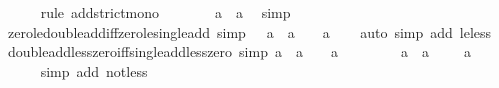 \begin{isabellebody}
\ \ \ \ \isamarkupfalse%
\ {\isacharparenleft}{\kern0pt}rule\ add{\isacharunderscore}{\kern0pt}strict{\isacharunderscore}{\kern0pt}mono{\isacharparenright}{\kern0pt}\isanewline
\ \ \isamarkupfalse%
\ \isamarkupfalse%
\ {\isachardoublequoteopen}{}\ {\isacharless}{\kern0pt}\ a\ {\isacharplus}{\kern0pt}\ a{\isachardoublequoteclose}\ \isamarkupfalse%
\ simp\isanewline
{}\isamarkupfalse%
%
\endisatagproof
{\isafoldproof}%
%
\isadelimproof
\isanewline
%
\endisadelimproof
\isanewline
{}\isamarkupfalse%
\ zero{\isacharunderscore}{\kern0pt}le{\isacharunderscore}{\kern0pt}double{\isacharunderscore}{\kern0pt}add{\isacharunderscore}{\kern0pt}iff{\isacharunderscore}{\kern0pt}zero{\isacharunderscore}{\kern0pt}le{\isacharunderscore}{\kern0pt}single{\isacharunderscore}{\kern0pt}add\ {\isacharbrackleft}{\kern0pt}simp{\isacharbrackright}{\kern0pt}{\isacharcolon}{\kern0pt}\ {\isachardoublequoteopen}{}\ {\isasymle}\ a\ {\isacharplus}{\kern0pt}\ a\ {\isasymlongleftrightarrow}\ {}\ {\isasymle}\ a{\isachardoublequoteclose}\isanewline
%
\isadelimproof
\ \ %
\endisadelimproof
%
\isatagproof
{}\isamarkupfalse%
\ {\isacharparenleft}{\kern0pt}auto\ simp\ add{\isacharcolon}{\kern0pt}\ le{\isacharunderscore}{\kern0pt}less{\isacharparenright}{\kern0pt}%
\endisatagproof
{\isafoldproof}%
%
\isadelimproof
\isanewline
%
\endisadelimproof
\isanewline
{}\isamarkupfalse%
\ double{\isacharunderscore}{\kern0pt}add{\isacharunderscore}{\kern0pt}less{\isacharunderscore}{\kern0pt}zero{\isacharunderscore}{\kern0pt}iff{\isacharunderscore}{\kern0pt}single{\isacharunderscore}{\kern0pt}add{\isacharunderscore}{\kern0pt}less{\isacharunderscore}{\kern0pt}zero\ {\isacharbrackleft}{\kern0pt}simp{\isacharbrackright}{\kern0pt}{\isacharcolon}{\kern0pt}\ {\isachardoublequoteopen}a\ {\isacharplus}{\kern0pt}\ a\ {\isacharless}{\kern0pt}\ {}\ {\isasymlongleftrightarrow}\ a\ {\isacharless}{\kern0pt}\ {}{\isachardoublequoteclose}\isanewline
%
\isadelimproof
%
\endisadelimproof
%
\isatagproof
{}\isamarkupfalse%
\ {\isacharminus}{\kern0pt}\isanewline
\ \ \isamarkupfalse%
\ {\isachardoublequoteopen}{\isasymnot}\ a\ {\isacharplus}{\kern0pt}\ a\ {\isacharless}{\kern0pt}\ {}\ {\isasymlongleftrightarrow}\ {\isasymnot}\ a\ {\isacharless}{\kern0pt}\ {}{\isachardoublequoteclose}\isanewline
\ \ \ \ \isamarkupfalse%
\ {\isacharparenleft}{\kern0pt}simp\ add{\isacharcolon}{\kern0pt}\ not{\isacharunderscore}{\kern0pt}less{\isacharparenright}{\kern0pt}\isanewline

\end{isabellebody}
